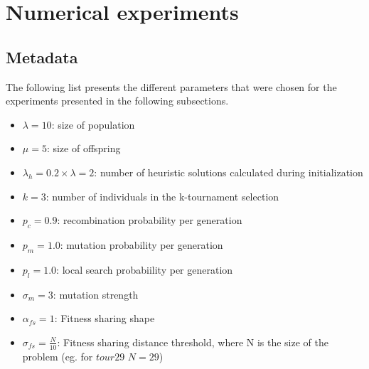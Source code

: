 \documentclass[a4paper,10pt]{article}
\newcommand{\ReplaceMe}[1]{{\color{blue}#1}}
\newcommand{\RemoveMe}[1]{{\color{purple}#1}}
\begin{document}
\section{Numerical experiments} \label{s:numerical_experiments}


\subsection{Metadata} \label{ss:metadata}



The following list presents the different parameters that were chosen for the experiments presented in the following subsections. 
\begin{itemize}
\item $\lambda = 10$: size of population
\item $\mu = 5$: size of offspring
\item $\lambda_h = 0.2 \times \lambda = 2$: number of heuristic solutions calculated during initialization
\item $k = 3$: number of individuals in the k-tournament selection
\item $p_c = 0.9$: recombination probability per generation
\item $p_m = 1.0$: mutation probability per generation
\item $p_l = 1.0$: local search probabiility per generation
\item $\sigma_m = 3$: mutation strength
\item $\alpha_{fs} = 1$: Fitness sharing shape
\item $\sigma_{fs} = \frac{N}{10}$: Fitness sharing distance threshold, where N is the size of the problem (eg. for $tour29$ $N=29$)
\end{itemize}
\end{document}
